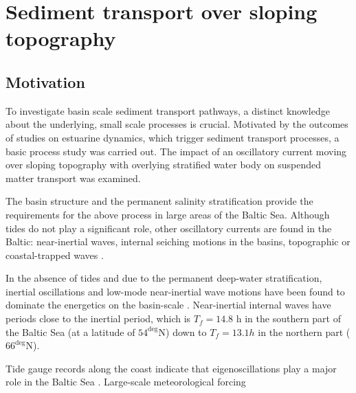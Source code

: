 \chapter{Sediment transport over sloping topography}
\label{kap-slope}

\section{Motivation}

To investigate basin scale sediment transport pathways, a distinct knowledge about the underlying, small scale processes is crucial. Motivated by the outcomes of studies on estuarine dynamics, which trigger sediment transport processes, a basic process study was carried out. The impact of an oscillatory current moving over sloping topography with overlying stratified water body on suspended matter transport was examined. 

The basin structure and the permanent salinity stratification provide the requirements for the above process in large areas of the Baltic Sea. Although tides do not play a significant role, other oscillatory currents are found in the Baltic: near-inertial waves, internal seiching motions in the basins, topographic \citep[][]{holtermann2012} or coastal-trapped waves \citep[][]{pizarro1998}.

In the absence of tides and due to the permanent deep-water stratification, inertial oscillations and low-mode near-inertial wave motions have been found to dominate the energetics on the basin-scale \citep[][]{vanderlee2011}. Near-inertial internal waves have periods close to the inertial period, which is $T_f = 14.8$ h in the southern part of the Baltic Sea (at a latitude of $54^\deg$N) down to $T_f = 13.1h$ in the northern part ($66^\deg$N). 

Tide gauge records along the coast indicate that eigenoscillations play a major role in the Baltic Sea \citep[][]{wubber1979}. Large-scale meteorological forcing 